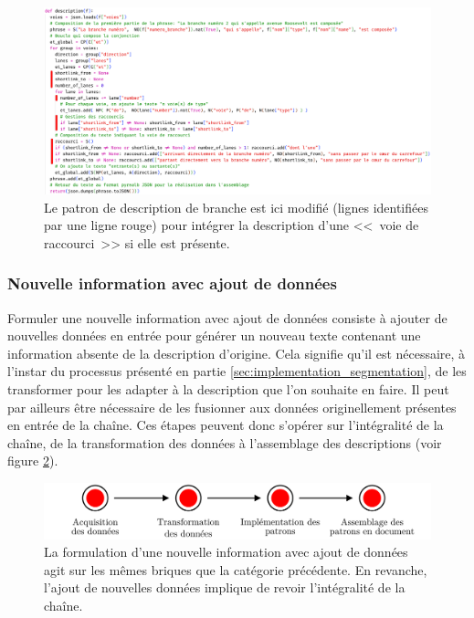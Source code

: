 \begin{itemize}
    \begin{figure}[H]
        \centering
        \includegraphics[width=\textwidth]{images/evaluation/pipeline/nouvelle_info.png}
        \caption[Patron modifié pour intégrer les <<~voies de raccourci~>>]{Le patron de description de branche est ici modifié (lignes identifiées par une ligne rouge) pour intégrer la description d'une <<~voie de raccourci~>> si elle est présente.}
        \label{fig:evaluation_patron_voie_de_raccourci}
    \end{figure}
\end{itemize}

\newpage

\subsubsection{Nouvelle information avec ajout de données}

Formuler une nouvelle information avec ajout de données consiste à ajouter de nouvelles données en entrée pour générer un nouveau texte contenant une information absente de la description d'origine. Cela signifie qu'il est nécessaire, à l'instar du processus présenté en partie \ref{sec:implementation_segmentation}, de les transformer pour les adapter à la description que l'on souhaite en faire. Il peut par ailleurs être nécessaire de les fusionner aux données originellement présentes en entrée de la chaîne. Ces étapes peuvent  donc s'opérer sur l'intégralité de la chaîne, de la transformation des données à l'assemblage des descriptions (voir figure \ref{fig:evaluation_nouvelle_information_avec_ajout}).

\begin{figure}[ht]
    \centering
    \includegraphics[width=\textwidth]{images/evaluation/pipeline/pipeline_ajout_donnees.pdf}
    \caption[Formulation d'une nouvelle information avec ajout de donnée dans la chaîne de description]{La formulation d'une nouvelle information avec ajout de données agit sur les mêmes briques que la catégorie précédente. En revanche, l'ajout de nouvelles données implique de revoir l'intégralité de la chaîne.}
    \label{fig:evaluation_nouvelle_information_avec_ajout}
\end{figure}

